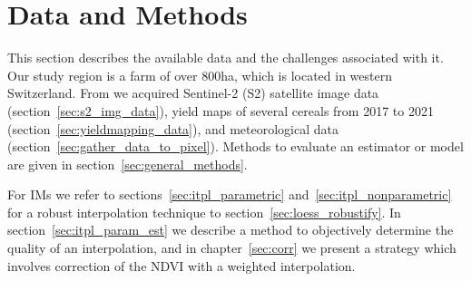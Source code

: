 \chapter{Data and Methods}\label{sec:data_methods}
{
	This section describes the available data and the challenges associated with it.
	Our study region is a farm of over 800ha, which is located in western Switzerland. From \cite{perichPixelbasedCropYield2022}  we acquired Sentinel-2 (S2) satellite image data (section~\ref{sec:s2_img_data}), yield maps of several cereals from 2017 to 2021 (section~\ref{sec:yieldmapping_data}), and meteorological data (section~\ref{sec:gather_data_to_pixel}). Methods to evaluate an estimator or model are given in section~\ref{sec:general_methods}.
	
	For {{IM}}s we refer to sections~\ref{sec:itpl_parametric} and~\ref{sec:itpl_nonparametric} for a robust interpolation technique to section~\ref{sec:loess_robustify}. In section~\ref{sec:itpl_param_est} we describe a method to objectively determine the quality of an interpolation, and in chapter~\ref{sec:corr} we present a strategy which involves correction of the NDVI with a weighted interpolation.	
}


